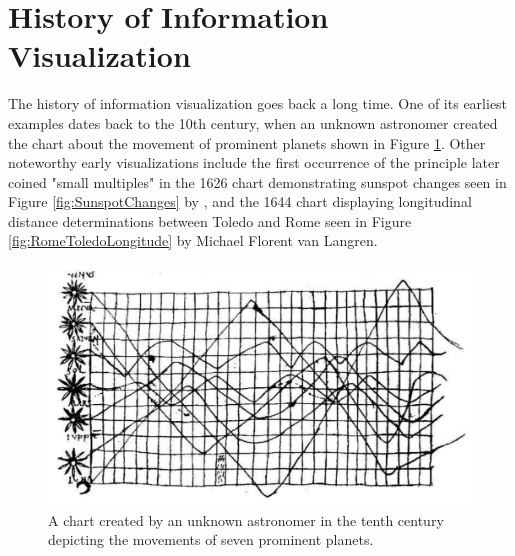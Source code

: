 \section{History of Information Visualization}

The history of information visualization goes back a long time.
One of its earliest examples dates back to the 10th century, when an unknown astronomer created the chart about the movement of prominent planets \parencite{CommentariiInSomniumScipionis} shown in Figure \ref{fig:PlanetaryMovements}.
Other noteworthy early visualizations include the first occurrence of the principle \cite{VisualDisplayOfQuantitativeInformation} later coined "small multiples" in the 1626 chart demonstrating sunspot changes seen in Figure \ref{fig:SunspotChanges} by \cite{RosaUrsina}, and the 1644 chart displaying longitudinal distance determinations between Toledo and Rome seen in Figure \ref{fig:RomeToledoLongitude} by Michael Florent van Langren.

\begin{figure}[tp]
\centering
\includegraphics[keepaspectratio,width=\linewidth,height=\fullh / 3]{images/planetary-movements.png}
\caption[Chart of Planetary Movements from the Tenth Century]{
  A chart created by an unknown astronomer in the tenth century depicting the movements of seven prominent planets.
}
\label{fig:PlanetaryMovements}
\end{figure}


